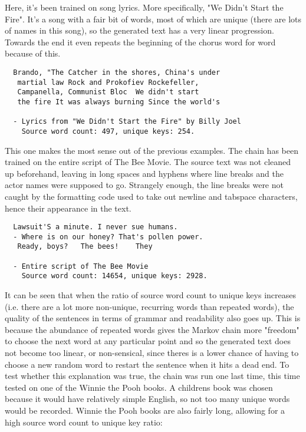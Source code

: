 \documentclass[11pt, a4paper]{article}
\begin{document}
  Here, it's been trained on song lyrics. More specifically, "We Didn't Start the Fire". It's a song with a fair bit of words, most of which are unique (there are lots of names in this song), so the generated text has a very linear progression. Towards the end it even repeats the beginning of the chorus word for word because of this. \newline

  \begin{lstlisting}
  Brando, "The Catcher in the shores, China's under
   martial law Rock and Prokofiev Rockefeller,
   Campanella, Communist Bloc  We didn't start
   the fire It was always burning Since the world's

  - Lyrics from "We Didn't Start the Fire" by Billy Joel
    Source word count: 497, unique keys: 254.
  \end{lstlisting}

  This one makes the most sense out of the previous examples. The chain has been trained on the entire script of The Bee Movie. The source text was not cleaned up beforehand, leaving in long spaces and hyphens where line breaks and the actor names were supposed to go. Strangely enough, the line breaks were not caught by the formatting code used to take out newline and tabspace characters, hence their appearance in the text. \newline

  \begin{lstlisting}
  Lawsuit'S a minute. I never sue humans.
  - Where is on our honey? That's pollen power.
   Ready, boys?   The bees!    They

  - Entire script of The Bee Movie
    Source word count: 14654, unique keys: 2928.
  \end{lstlisting}

  It can be seen that when the ratio of source word count to unique keys increases (i.e. there are a lot more non-unique, recurring words than repeated words), the quality of the sentences in terms of grammar and readability also goes up. This is because the abundance of repeated words gives the Markov chain more "freedom" to choose the next word at any particular point and so the generated text does not become too linear, or non-sensical, since theres is a lower chance of having to choose a new random word to restart the sentence when it hits a dead end. To test whether this explanation was true, the chain was run one last time, this time tested on one of the Winnie the Pooh books. A childrens book was chosen because it would have relatively simple English, so not too many unique words would be recorded. Winnie the Pooh books are also fairly long, allowing for a high source word count to unique key ratio:
\end{document}
